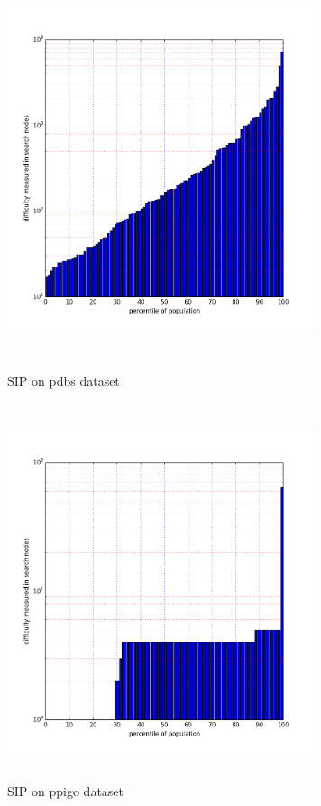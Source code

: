\documentclass{l4proj}
\begin{document}
\begin{figure}[H]
\centering
\begin{minipage}[t]{.5\textwidth}
  \centering
  \includegraphics[height=11cm,width=9cm]{images/plots/pdbsPercentileLog.png}
  \caption{SIP on pdbs dataset}
  \label{pdbsNodes}
\end{minipage}%
\begin{minipage}[t]{.5\textwidth}
  \centering
  \includegraphics[height=11cm,width=9cm]{images/plots/ppigoPercentileLog.png}
  \caption{SIP on ppigo dataset}
  \label{ppigoNodes}
\end{minipage}
\end{figure}
\end{document}
